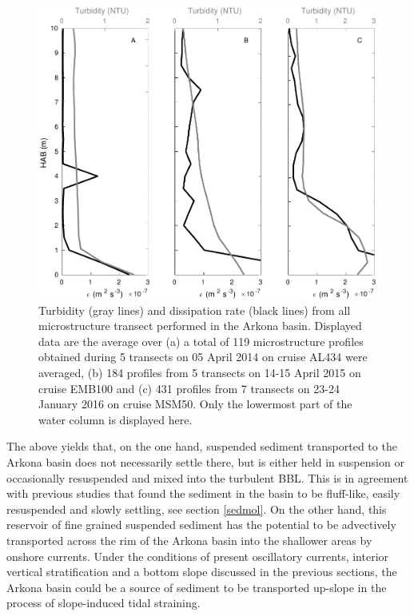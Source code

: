    \begin{figure}[ht]
\includegraphics[width=15cm]{bilder/arkona_mss.pdf}
 \caption{Turbidity (gray lines) and dissipation rate (black lines) from all 
microstructure transect performed in the Arkona basin. Displayed data are the 
average over (a) a total of 119 microstructure profiles obtained during 5 
transects on 05 April 2014 on cruise AL434 were averaged, (b) 184 profiles from 
5 transects on 14-15 April 2015 on cruise EMB100 and (c) 431 profiles from 7 
transects on 23-24 January 2016 on cruise MSM50. Only the lowermost part of 
the water column is displayed here.}
 \label{abmss}
 \end{figure}

The above yields that, on the one hand, suspended sediment transported to the 
Arkona basin does not necessarily settle there, but is either held in 
suspension or occasionally resuspended and mixed into the turbulent BBL. This 
is in agreement with previous studies that found the sediment in the basin to 
be fluff-like, easily resuspended and slowly settling, see section 
\ref{sedmol}. On the other hand, this reservoir of fine grained 
suspended sediment has the potential to be advectively 
transported across the rim of the Arkona basin into the shallower areas by 
onshore currents. Under the conditions of present oscillatory currents, 
interior vertical stratification and a bottom slope discussed in the previous 
sections, the Arkona basin could be a source of sediment to be transported 
up-slope in the process of slope-induced tidal straining.

